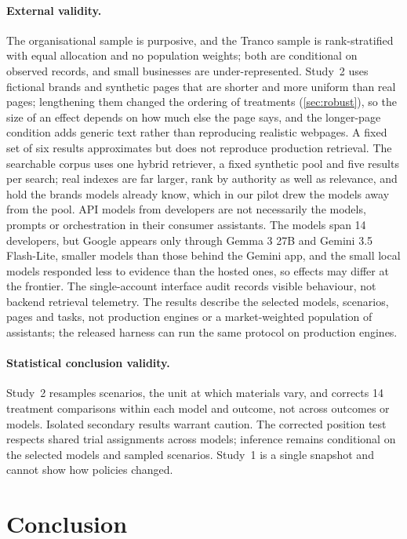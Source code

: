 \documentclass[11pt]{article}
\begin{document}
\paragraph{External validity.} The organisational sample is purposive, and the Tranco sample is rank-stratified with
equal allocation and no population weights; both are conditional on observed records, and small businesses are
under-represented. Study~2 uses fictional brands and synthetic pages that are shorter and more uniform than real
pages; lengthening them changed the ordering of treatments (\cref{sec:robust}), so the size of an effect depends on how
much else the page says, and the longer-page condition adds generic text rather than reproducing realistic webpages. A
fixed set of six results approximates but does not reproduce production retrieval. The searchable corpus uses one hybrid
retriever, a fixed synthetic pool and five results per search; real indexes are far larger, rank by authority as well
as relevance, and hold the brands models already know, which in our pilot drew the models away from the pool. API models
from developers are not necessarily the models, prompts or orchestration in their consumer assistants. The models span
14 developers, but Google appears only through Gemma 3 27B and Gemini 3.5 Flash-Lite, smaller models than those behind
the Gemini app, and the small local models responded less to evidence than the hosted ones, so effects may differ at
the frontier. The single-account interface audit records visible behaviour, not backend retrieval telemetry. The
results describe the selected models, scenarios, pages and tasks, not production engines or a market-weighted
population of assistants; the released harness can run the same protocol on production engines.

\paragraph{Statistical conclusion validity.} Study~2 resamples scenarios, the unit at which materials vary, and
corrects 14 treatment comparisons within each model and outcome, not across outcomes or models. Isolated secondary
results warrant caution. The corrected position test respects shared trial assignments across models; inference remains
conditional on the selected models and sampled scenarios. Study~1 is a single snapshot and cannot show how policies
changed.

\section{Conclusion}
\label{sec:conclusion}
\end{document}
